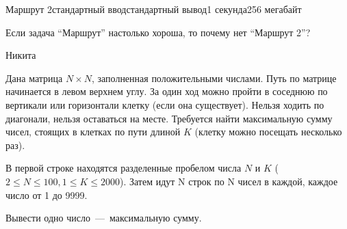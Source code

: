 \begin{problem}{Маршрут 2}{стандартный ввод}{стандартный вывод}{1 секунда}{256 мегабайт}

\epigraph{Если задача ``Маршрут'' настолько хороша, то почему нет ``Маршрут 2''?}
{Никита}

Дана матрица $N \times N$, заполненная положительными числами. Путь по матрице начинается в левом верхнем углу. За один ход можно пройти в соседнюю по вертикали или горизонтали клетку (если она существует). Нельзя ходить по диагонали, нельзя оставаться на месте. Требуется найти максимальную сумму чисел, стоящих в клетках по пути длиной $K$ (клетку можно посещать несколько раз).

\InputFile
В первой строке находятся разделенные пробелом числа $N$ и $K$ ($2 \le N \le 100, 1 \le K \le 2000$). Затем идут N строк по N чисел в каждой, каждое число от 1 до 9999.

\OutputFile
Вывести одно число~---~максимальную сумму.

\Example

\begin{example}
%
\end{example}

\end{problem}

